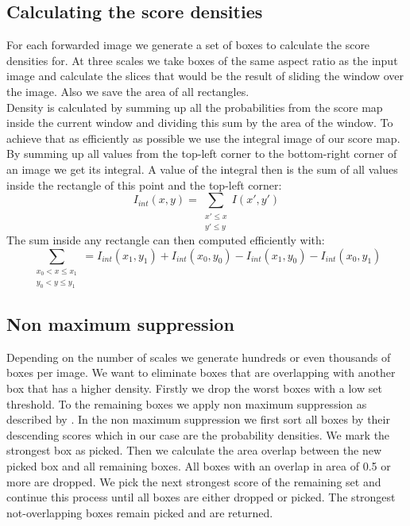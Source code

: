 \subsection{Calculating the score densities}
\label{sec:pipeline:eval:density}
For each forwarded image we generate a set of boxes to calculate the score densities for. At three scales we take boxes of the same aspect ratio as the input image and calculate the slices that would be the result of sliding the window over the image. Also we save the area of all rectangles.\\
Density is calculated by summing up all the probabilities from the score map inside the current window and dividing this sum by the area of the window. To achieve that as efficiently as possible we use the integral image of our score map. By summing up all values from the top-left corner to the bottom-right corner of an image we get its integral. A value of the integral then is the sum of all values inside the rectangle of this point and the top-left corner:
\begin{equation}
    I_{int}(x, y) = \sum_{\substack{x' \le x\\ y' \le y}} I(x', y')
\end{equation}
The sum inside any rectangle can then computed efficiently with:
\begin{equation}
    \sum_{\substack{x_0 < x \le x_1\\ y_0 < y \le y_1}} = I_{int}(x_1, y_1) + I_{int}(x_0, y_0) - I_{int}(x_1, y_0) - I_{int}(x_0, y_1)
\end{equation}

\subsection{Non maximum suppression}
\label{sec:pipeline:eval:nms}
Depending on the number of scales we generate hundreds or even thousands of boxes per image. We want to eliminate boxes that are overlapping with another box that has a higher density. Firstly we drop the worst boxes with a low set threshold. To the remaining boxes we apply non maximum suppression as described by \citet{felzenszwalb_discriminatively_2008}. In the non maximum suppression we first sort all boxes by their descending scores which in our case are the probability densities. We mark the strongest box as picked. Then we calculate the area overlap between the new picked box and all remaining boxes. All boxes with an overlap in area of 0.5 or more are dropped. We pick the next strongest score of the remaining set and continue this process until all boxes are either dropped or picked. The strongest not-overlapping boxes remain picked and are returned.
